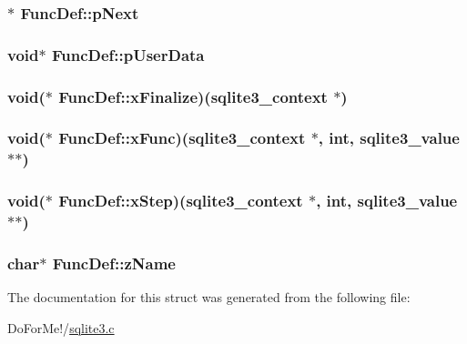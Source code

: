\hypertarget{struct_func_def_a1ebe547d000172d9ae44d12eeb433a48}{
\subsubsection[{p\-Next}]{$\ast$ Func\-Def\-::p\-Next}}\label{struct_func_def_a1ebe547d000172d9ae44d12eeb433a48}
\hypertarget{struct_func_def_a04fdde2f96be198823a483bebcfd3ae3}{
\subsubsection[{p\-User\-Data}]{\setlength{\rightskip}{0pt plus 5cm}void$\ast$ Func\-Def\-::p\-User\-Data}}\label{struct_func_def_a04fdde2f96be198823a483bebcfd3ae3}
\hypertarget{struct_func_def_a3c649453d5a58c697b7ee54ee999e7ef}{
\subsubsection[{x\-Finalize}]{\setlength{\rightskip}{0pt plus 5cm}void($\ast$ Func\-Def\-::x\-Finalize)({\bf sqlite3\-\_\-context} $\ast$)}}\label{struct_func_def_a3c649453d5a58c697b7ee54ee999e7ef}
\hypertarget{struct_func_def_a1cfd07fdfe22ff504ea7f36c0752c1da}{
\subsubsection[{x\-Func}]{\setlength{\rightskip}{0pt plus 5cm}void($\ast$ Func\-Def\-::x\-Func)({\bf sqlite3\-\_\-context} $\ast$, int, {\bf sqlite3\-\_\-value} $\ast$$\ast$)}}\label{struct_func_def_a1cfd07fdfe22ff504ea7f36c0752c1da}
\hypertarget{struct_func_def_ab1d1c623844534b17ea3ccce3f815464}{
\subsubsection[{x\-Step}]{\setlength{\rightskip}{0pt plus 5cm}void($\ast$ Func\-Def\-::x\-Step)({\bf sqlite3\-\_\-context} $\ast$, int, {\bf sqlite3\-\_\-value} $\ast$$\ast$)}}\label{struct_func_def_ab1d1c623844534b17ea3ccce3f815464}
\hypertarget{struct_func_def_a1135e622a3a505c7c463e975846ef926}{
\subsubsection[{z\-Name}]{\setlength{\rightskip}{0pt plus 5cm}char$\ast$ Func\-Def\-::z\-Name}}\label{struct_func_def_a1135e622a3a505c7c463e975846ef926}


The documentation for this struct was generated from the following file\-:\begin{DoxyCompactItemize}
\item 
Do\-For\-Me!/\hyperlink{sqlite3_8c}{sqlite3.\-c}\end{DoxyCompactItemize}
